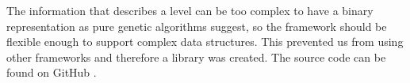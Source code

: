 \documentclass[runningheads,a4paper]{llncs}
\begin{document}



The information that describes a level can be too complex to have a binary 
representation as pure genetic algorithms suggest, so the framework should be 
flexible enough to support complex data structures. This prevented us from using other
frameworks
and therefore a library was created. The source  code can be found on GitHub \cite{ab-level}.



\end{document}
